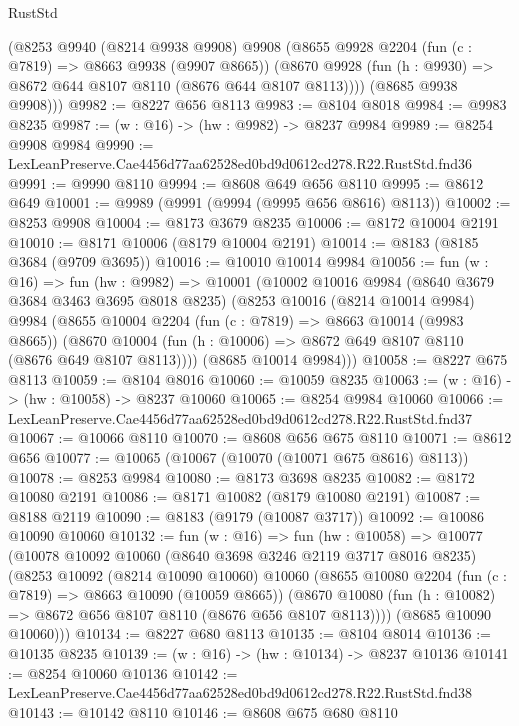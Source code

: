 \begin{lexlean}{RustStd}
\begin{coremodule}
      (@8253
        @9940
        (@8214 @9938 @9908)
        @9908
        (@8655
          @9928
          @2204
          (fun (c : @7819) => @8663 @9938 (@9907 @8665))
          (@8670 @9928 (fun (h : @9930) => @8672 @644 @8107 @8110 (@8676 @644 @8107 @8113))))
        (@8685 @9938 @9908)))
@9982 := @8227 @656 @8113
@9983 := @8104 @8018
@9984 := @9983 @8235
@9987 := (w : @16) -> (hw : @9982) -> @8237 @9984
@9989 := @8254 @9908 @9984
@9990 := LexLeanPreserve.Cae4456d77aa62528ed0bd9d0612cd278.R22.RustStd.fnd36
@9991 := @9990 @8110
@9994 := @8608 @649 @656 @8110
@9995 := @8612 @649
@10001 := @9989 (@9991 (@9994 (@9995 @656 @8616) @8113))
@10002 := @8253 @9908
@10004 := @8173 @3679 @8235
@10006 := @8172 @10004 @2191
@10010 := @8171 @10006 (@8179 @10004 @2191)
@10014 := @8183 (@8185 @3684 (@9709 @3695))
@10016 := @10010 @10014 @9984
@10056 := fun (w : @16) =>
  fun (hw : @9982) =>
  @10001
    (@10002
      @10016
      @9984
      (@8640 @3679 @3684 @3463 @3695 @8018 @8235)
      (@8253
        @10016
        (@8214 @10014 @9984)
        @9984
        (@8655
          @10004
          @2204
          (fun (c : @7819) => @8663 @10014 (@9983 @8665))
          (@8670 @10004 (fun (h : @10006) => @8672 @649 @8107 @8110 (@8676 @649 @8107 @8113))))
        (@8685 @10014 @9984)))
@10058 := @8227 @675 @8113
@10059 := @8104 @8016
@10060 := @10059 @8235
@10063 := (w : @16) -> (hw : @10058) -> @8237 @10060
@10065 := @8254 @9984 @10060
@10066 := LexLeanPreserve.Cae4456d77aa62528ed0bd9d0612cd278.R22.RustStd.fnd37
@10067 := @10066 @8110
@10070 := @8608 @656 @675 @8110
@10071 := @8612 @656
@10077 := @10065 (@10067 (@10070 (@10071 @675 @8616) @8113))
@10078 := @8253 @9984
@10080 := @8173 @3698 @8235
@10082 := @8172 @10080 @2191
@10086 := @8171 @10082 (@8179 @10080 @2191)
@10087 := @8188 @2119
@10090 := @8183 (@9179 (@10087 @3717))
@10092 := @10086 @10090 @10060
@10132 := fun (w : @16) =>
  fun (hw : @10058) =>
  @10077
    (@10078
      @10092
      @10060
      (@8640 @3698 @3246 @2119 @3717 @8016 @8235)
      (@8253
        @10092
        (@8214 @10090 @10060)
        @10060
        (@8655
          @10080
          @2204
          (fun (c : @7819) => @8663 @10090 (@10059 @8665))
          (@8670 @10080 (fun (h : @10082) => @8672 @656 @8107 @8110 (@8676 @656 @8107 @8113))))
        (@8685 @10090 @10060)))
@10134 := @8227 @680 @8113
@10135 := @8104 @8014
@10136 := @10135 @8235
@10139 := (w : @16) -> (hw : @10134) -> @8237 @10136
@10141 := @8254 @10060 @10136
@10142 := LexLeanPreserve.Cae4456d77aa62528ed0bd9d0612cd278.R22.RustStd.fnd38
@10143 := @10142 @8110
@10146 := @8608 @675 @680 @8110

\end{coremodule}
\end{lexlean}

